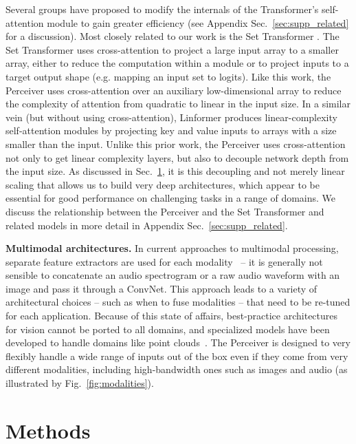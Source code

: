Several groups have proposed to modify the internals of the Transformer's self-attention module to gain greater efficiency (see Appendix Sec.~\ref{sec:supp_related} for a discussion). Most closely related to our work is the Set Transformer \cite{lee2019set}. The Set Transformer uses cross-attention to project a large input array to a smaller array, either to reduce the computation within a module or to project inputs to a target output shape (e.g. mapping an input set to logits). Like this work, the Perceiver uses cross-attention over an auxiliary low-dimensional array to reduce the complexity of attention from quadratic to linear in the input size. In a similar vein (but without using cross-attention), Linformer \cite{wang2020linformer} produces linear-complexity self-attention modules by projecting key and value inputs to arrays with a size smaller than the input. Unlike this prior work, the Perceiver uses cross-attention not only to get linear complexity layers, but also to decouple network depth from the input size. As discussed in Sec.~\ref{sec:methods}, it is this decoupling and not merely linear scaling that allows us to build very deep architectures, which appear to be essential for good performance on challenging tasks in a range of domains. We discuss the relationship between the Perceiver and the Set Transformer and related models in more detail in Appendix Sec.~\ref{sec:supp_related}.

 \textbf{Multimodal architectures.} In current approaches to multimodal processing, separate feature extractors are used for each modality~\cite{kaiser2017one,arandjelovic2018objects,wang2020makes,chen2019uniter,alayrac2020self,lee2020making,xiao2020audiovisual} -- it is generally not sensible to concatenate an audio spectrogram or a raw audio waveform with an image and pass it through a ConvNet. This approach leads to a variety of architectural choices -- such as when to fuse modalities -- that need to be re-tuned for each application. Because of this state of affairs, best-practice architectures for vision cannot be ported to all domains, and specialized models have been developed to handle domains like point clouds~\cite{qi2017pointnet++,guo2020pct}. The Perceiver is designed to very flexibly handle a wide range of inputs out of the box even if they come from very different modalities, including high-bandwidth ones such as images and audio (as illustrated by Fig.~\ref{fig:modalities}).

\section{Methods}
\label{sec:methods}

